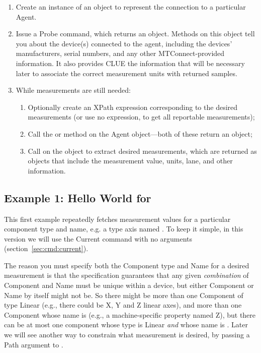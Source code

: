 \begin{enumerate}
\item Create an instance of an  object to represent the
  connection 
  to a particular Agent.
\item Issue a Probe command,  which returns an 
  object.  Methods on this object tell you about the device(s) connected
  to the agent, including the devices' manufacturers, serial numbers,
  and any other MTConnect-provided information.  It also provides 
  CLUE the information that will be necessary later
  to associate the correct measurement units with returned samples.
\item While measurements are still needed:
  \begin{enumerate}
  \item Optionally create an XPath expression corresponding to the desired
    measurements (or use no expression, to get all reportable measurements);
  \item Call the  or  method on the Agent
    object---both of these return an  object;
  \item Call  on the
     object to extract desired measurements,
    which are returned as  objects that include the
    measurement value, units, lane, and other information.
  \end{enumerate}
\end{enumerate}

\subsection{Example 1: Hello World for \mtc}
\label{sec:ex:helloworld}

This first example repeatedly fetches measurement values for a
particular
component type and name, 
e.g. a  type axis named .
To keep it simple, in this version we will use the
Current command with no arguments (section~\ref{sec:cmd:current}).

The reason you must specify both the Component type and Name for a
desired measurement is that the \mtc{} specification guarantees that any
given \emph{combination} of Component and Name must be unique within a
device, but either Component or Name by itself might not be.  So there
might be more than one Component of type Linear (e.g., there could be X,
Y and Z linear axes), and more than one
Component whose name is  (e.g., a machine-specific property named
Z), but there can be at most one component whose
type is Linear \emph{and} whose name is .  Later we will see
another way to constrain what measurement is desired, by passing a Path
argument to .

